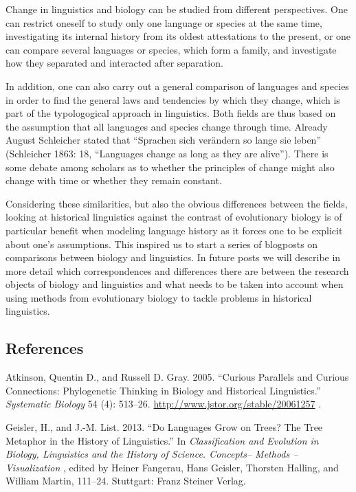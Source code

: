 \documentclass[
  a4paper,
  14pt,
  oneside,
  tablecaptionabove
]{scrbook}
\begin{document}
Change in linguistics and biology can be studied from different
perspectives. One can restrict oneself to study only one language or
species at the same time, investigating its internal history from its
oldest attestations to the present, or one can compare several languages
or species, which form a family, and investigate how they separated and
interacted after separation.

In addition, one can also carry out a general comparison of languages
and species in order to find the general laws and tendencies by which
they change, which is part of the typologogical approach in linguistics.
Both fields are thus based on the assumption that all languages and
species change through time. Already August Schleicher stated that
\enquote{Sprachen sich verändern so lange sie leben} (Schleicher 1863:
18, \enquote{Languages change as long as they are alive}). There is some
debate among scholars as to whether the principles of change might also
change with time or whether they remain constant.

Considering these similarities, but also the obvious differences between
the fields, looking at historical linguistics against the contrast of
evolutionary biology is of particular benefit when modeling language
history as it forces one to be explicit about one's assumptions. This
inspired us to start a series of blogposts on comparisons between
biology and linguistics. In future posts we will describe in more detail
which correspondences and differences there are between the research
objects of biology and linguistics and what needs to be taken into
account when using methods from evolutionary biology to tackle problems
in historical linguistics.

\subsection*{References}

\nopagebreak\hangindent=0.7cm {\small Atkinson, Quentin D., and Russell D. Gray. 2005. \enquote{Curious
Parallels and Curious Connections: Phylogenetic Thinking in Biology and
Historical Linguistics.} \emph{Systematic Biology} 54 (4): 513--26.
\url{http://www.jstor.org/stable/20061257} . }

\nopagebreak\hangindent=0.7cm {\small Geisler, H., and J.-M. List. 2013. \enquote{Do Languages Grow on
Trees? The Tree Metaphor in the History of Linguistics.} In
\emph{Classification and Evolution in Biology, Linguistics and the
History of Science. Concepts-- Methods -- Visualization} , edited by
Heiner Fangerau, Hans Geisler, Thorsten Halling, and William Martin,
111--24. Stuttgart: Franz Steiner Verlag. }
\end{document}
